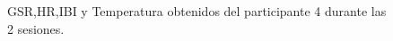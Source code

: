 \begin{figure}[h]
        \centering
        \caption{GSR,HR,IBI y Temperatura obtenidos del participante 4 durante las 2 sesiones.}\label{fig:data_p4}
\end{figure}
\pagebreak

